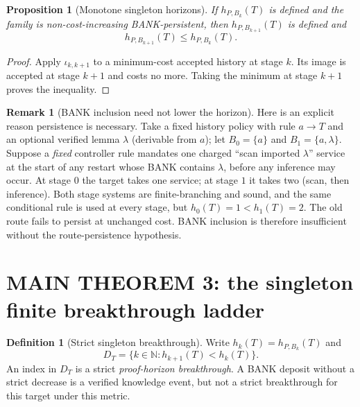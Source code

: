 \documentclass[11pt]{article}
\newtheorem{proposition}[theorem]{Proposition}
\theoremstyle{definition}
\newtheorem{definition}[theorem]{Definition}
\newtheorem{remark}[theorem]{Remark}
\newcommand{\bbN}{\mathbb{N}}
\begin{document}
\begin{proposition}[Monotone singleton horizons]\label{prop:mono}
If $h_{P,B_k}(T)$ is defined and the family is non-cost-increasing BANK-persistent, then $h_{P,B_{k+1}}(T)$ is defined and
\[
h_{P,B_{k+1}}(T)\le h_{P,B_k}(T).
\]
\end{proposition}
\begin{proof}
Apply $\iota_{k,k+1}$ to a minimum-cost accepted history at stage $k$. Its image is accepted at stage $k+1$ and costs no more. Taking the minimum at stage $k+1$ proves the inequality.
\end{proof}

\begin{remark}[BANK inclusion need not lower the horizon]\label{rem:counterexample}
Here is an explicit reason persistence is necessary. Take a fixed history policy with rule $a\to T$ and an optional verified lemma $\lambda$ (derivable from $a$); let $B_0=\{a\}$ and $B_1=\{a,\lambda\}$. Suppose a \emph{fixed} controller rule mandates one charged ``scan imported $\lambda$'' service at the start of any restart whose BANK contains $\lambda$, before any inference may occur. At stage $0$ the target takes one service; at stage $1$ it takes two (scan, then inference). Both stage systems are finite-branching and sound, and the same conditional rule is used at every stage, but $h_0(T)=1<h_1(T)=2$. The old route fails to persist at unchanged cost. BANK inclusion is therefore insufficient without the route-persistence hypothesis.
\end{remark}

\section{MAIN THEOREM 3: the singleton finite breakthrough ladder}
\begin{definition}[Strict singleton breakthrough]
Write $h_k(T)=h_{P,B_k}(T)$ and
\[
D_T=\{k\in\bbN:h_{k+1}(T)<h_k(T)\}.
\]
An index in $D_T$ is a strict \emph{proof-horizon breakthrough}. A BANK deposit without a strict decrease is a verified knowledge event, but not a strict breakthrough for this target under this metric.
\end{definition}
\end{document}
